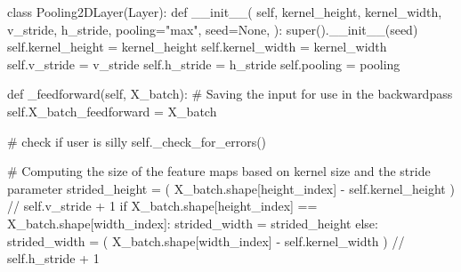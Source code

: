 \documentclass[%
oneside,                 %
final,                   %
10pt]{article}
\begin{document}
\bpycod
class Pooling2DLayer(Layer):
    def __init__(
        self,
        kernel_height,
        kernel_width,
        v_stride,
        h_stride,
        pooling="max",
        seed=None,
    ):
        super().__init__(seed)
        self.kernel_height = kernel_height
        self.kernel_width = kernel_width
        self.v_stride = v_stride
        self.h_stride = h_stride
        self.pooling = pooling

    def _feedforward(self, X_batch):
        # Saving the input for use in the backwardpass
        self.X_batch_feedforward = X_batch

        # check if user is silly
        self._check_for_errors()

        # Computing the size of the feature maps based on kernel size and the stride parameter
        strided_height = (
            X_batch.shape[height_index] - self.kernel_height
        ) // self.v_stride + 1
        if X_batch.shape[height_index] == X_batch.shape[width_index]:
            strided_width = strided_height
        else:
            strided_width = (
                X_batch.shape[width_index] - self.kernel_width
            ) // self.h_stride + 1
\end{document}
